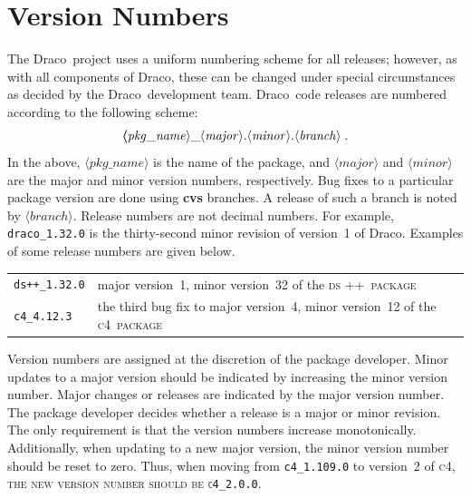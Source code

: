 \documentclass[11pt]{nmemo}
\newcommand{\draco}{\normalfont\normalsize\textsf Draco}
\newcommand{\cfour}{\normalfont\normalsize\scshape c\small 4}
\newcommand{\dsxx}{\normalfont\normalsize\scshape ds\raisebox{.2ex}
  {\scriptsize ++}}
\begin{document}

\section{Version Numbers}

The \draco\ project uses a uniform numbering scheme for all releases;
however, as with all components of \draco, these can be changed under
special circumstances as decided by the \draco\ development team.
\draco\ code releases are numbered according to the following scheme:
\begin{equation}
  \boldsymbol
  \langle\mathit{pkg\_name}\rangle\_
  \langle\mathit{major}\rangle.
  \langle\mathit{minor}\rangle.
  \langle\mathit{branch}\rangle\; .
  \notag
\end{equation}
In the above, $\langle\mathit{pkg\_name}\rangle$ is the name of the
package, and $\langle\mathit{major}\rangle$ and
$\langle\mathit{minor}\rangle$ are the major and minor version
numbers, respectively. Bug fixes to a particular package version are
done using {\bf cvs} branches.  A release of such a branch is noted by
$\langle\mathit{branch}\rangle$.  Release numbers are not decimal
numbers.  For example, \texttt{draco\_1.32.0} is the thirty-second
minor revision of version~1 of \draco.  Examples of some release
numbers are given below.
\begin{center}
  \begin{tabular}{ll}
    \texttt{ds++\_1.32.0} & major version~1, minor version~32 of the
    \dsxx\ package \\
    \texttt{c4\_4.12.3} & the third bug fix to major version~4, minor
    version~12 of the \cfour\ package \\
  \end{tabular}
\end{center}

Version numbers are assigned at the discretion of the package
developer.  Minor updates to a major version should be indicated by
increasing the minor version number.  Major changes or releases are
indicated by the major version number.  The package developer decides
whether a release is a major or minor revision.  The only requirement
is that the version numbers increase monotonically.  Additionally,
when updating to a new major version, the minor version number should
be reset to zero.  Thus, when moving from \texttt{c4\_1.109.0} to
version~2 of \cfour, the new version number should be
\texttt{c4\_2.0.0}.
\end{document}
